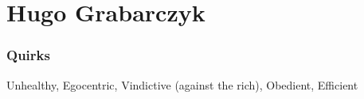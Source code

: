 \section*{Hugo Grabarczyk}
\subsubsection*{Quirks}
Unhealthy, Egocentric, Vindictive (against the rich), Obedient, Efficient